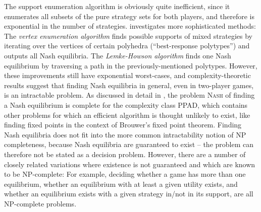 \documentclass[a4paper]{scrreprt}
\begin{document}
    
    The support enumeration algorithm is obviously quite inefficient, since it enumerates all subsets of the pure strategy sets for both players, and therefore is exponential in the number of strategies.
    \cite{bib:nisanAlgorithmicGameTheoryCh3EquilibriumComputation} investigates more sophisticated methods: The \emph{vertex enumeration algorithm} finds possible supports of mixed strategies by iterating over the vertices of certain polyhedra (“best-response polytypes”) and outputs all Nash equilibria.
    The \emph{Lemke-Howson algorithm} finds one Nash equilibrium by traversing a path in the previously-mentioned polytypes.
    However, these improvements still have exponential worst-cases, and complexity-theoretic results suggest that finding Nash equilibria in general, even in two-player games, is an intractable problem. As discussed in detail in \cite{bib:nisanAlgorithmicGameTheoryCh2ComplexityNash}, the problem \textsc{Nash} of finding a Nash equilibrium is complete for the complexity class PPAD, which contains other problems for which an efficient algorithm is thought unlikely to exist, like finding fixed points in the context of Brouwer's fixed point theorem.
    Finding Nash equilibria does not fit into the more common intractability notion of NP completeness, because Nash equilibria are guaranteed to exist -- the problem can therefore not be stated as a decision problem. However, there are a number of closely related variations where existence is not guaranteed and which are known to be NP-complete: %
    For example, deciding whether a game has more than one equilibrium, whether an equilibrium with at least a given utility exists, and whether an equilibrium exists with a given strategy in/not in its support, are all NP-complete problems.
    
    
    
\end{document}
